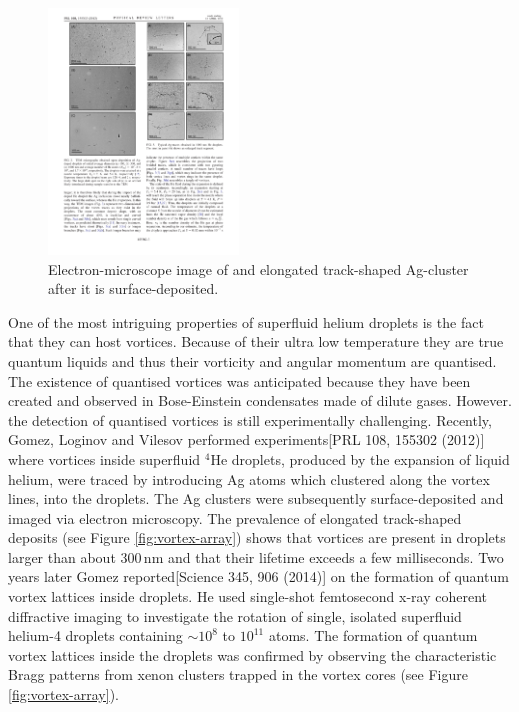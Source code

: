 \documentclass[11pt,a4paper,twoside]{article}
\newcommand{\unit}[1]{\,\mathrm{#1}}
\begin{document}
		\begin{figure}[t]
			\begin{center}
				\includegraphics[width=0.45\textwidth]{silver-filament}
			\end{center}
			\caption{Electron-microscope image of and elongated track-shaped Ag-cluster after it is surface-deposited.}
			\label{fig:silver-filament}
		\end{figure}	
				
		One of the most intriguing properties of superfluid helium droplets is the fact that they can host vortices. Because of their ultra low temperature they are true quantum liquids and thus their vorticity and angular momentum are quantised. The existence of quantised vortices was anticipated because they have been created and observed in Bose-Einstein condensates made of dilute gases. However. the detection of quantised vortices is still experimentally challenging. Recently, Gomez, Loginov and Vilesov performed experiments[PRL 108, 155302 (2012)] where vortices inside superfluid $^4$He droplets, produced by the expansion of liquid helium, were traced by introducing Ag atoms which clustered along the vortex lines, into the droplets. The Ag clusters were subsequently surface-deposited and imaged via electron microscopy. The prevalence of elongated track-shaped deposits (see Figure \ref{fig:vortex-array}) shows that vortices are present in droplets larger than about $300\unit{nm}$ and that their lifetime exceeds a few milliseconds. Two years later Gomez reported[Science 345, 906 (2014)] on the formation of quantum vortex lattices inside droplets. He used single-shot femtosecond x-ray coherent diffractive imaging to investigate the rotation of single, isolated superfluid helium-4 droplets containing $\sim\!10^8$ to $10^{11}$ atoms. The formation of quantum vortex lattices inside the droplets was confirmed by observing the characteristic Bragg patterns from xenon clusters trapped in the vortex cores (see Figure \ref{fig:vortex-array}).\\
\end{document}
